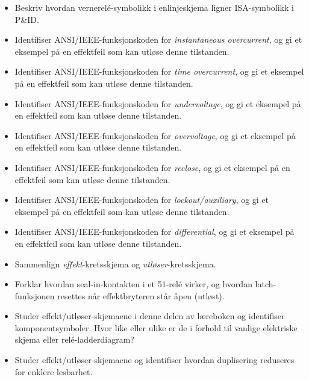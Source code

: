 \begin{itemize}
\item{} Beskriv hvordan vernerelé-symbolikk i enlinjeskjema ligner ISA-symbolikk i P\&ID.
\item{} Identifiser ANSI/IEEE-funksjonskoden for {\it instantaneous overcurrent}, og gi et eksempel på en effektfeil som kan utløse denne tilstanden.
\item{} Identifiser ANSI/IEEE-funksjonskoden for {\it time overcurrent}, og gi et eksempel på en effektfeil som kan utløse denne tilstanden.
\item{} Identifiser ANSI/IEEE-funksjonskoden for {\it undervoltage}, og gi et eksempel på en effektfeil som kan utløse denne tilstanden.
\item{} Identifiser ANSI/IEEE-funksjonskoden for {\it overvoltage}, og gi et eksempel på en effektfeil som kan utløse denne tilstanden.
\item{} Identifiser ANSI/IEEE-funksjonskoden for {\it reclose}, og gi et eksempel på en effektfeil som kan utløse denne tilstanden.
\item{} Identifiser ANSI/IEEE-funksjonskoden for {\it lockout/auxiliary}, og gi et eksempel på en effektfeil som kan utløse denne tilstanden.
\item{} Identifiser ANSI/IEEE-funksjonskoden for {\it differential}, og gi et eksempel på en effektfeil som kan utløse denne tilstanden.
\item{} Sammenlign {\it effekt}-kretsskjema og {\it utløser}-kretsskjema.
\item{} Forklar hvordan seal-in-kontakten i et 51-relé virker, og hvordan latch-funksjonen resettes når effektbryteren står åpen (utløst).
\item{} Studer effekt/utløser-skjemaene i denne delen av læreboken og identifiser komponentsymboler. Hvor like eller ulike er de i forhold til vanlige elektriske skjema eller relé-ladderdiagram?
\item{} Studer effekt/utløser-skjemaene og identifiser hvordan duplisering reduseres for enklere lesbarhet.
\end{itemize}


